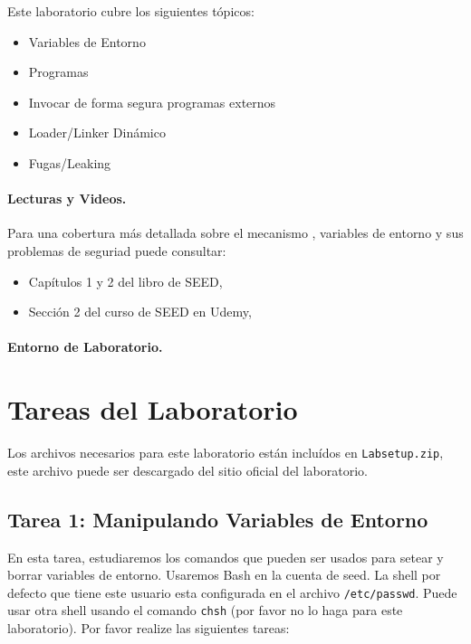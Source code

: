 Este laboratorio cubre los siguientes tópicos:

\begin{itemize}[noitemsep]
\item Variables de Entorno
\item Programas \setuid
\item Invocar de forma segura programas externos
\item Loader/Linker Dinámico
\item Fugas/Leaking
\end{itemize}


\paragraph{Lecturas y Videos.}
Para una cobertura más detallada sobre el mecanismo \setuid, variables de entorno y sus problemas de seguriad puede consultar:

\begin{itemize}
\item Capítulos 1 y 2 del libro de SEED, \seedbook
\item Sección 2 del curso de SEED en Udemy, \seedcsvideo
\end{itemize}

\paragraph{Entorno de Laboratorio.} \seedenvironmentC





\section{Tareas del Laboratorio}

Los archivos necesarios para este laboratorio están incluídos en \texttt{Labsetup.zip}, este archivo puede ser descargado del sitio oficial del laboratorio.


\subsection{Tarea 1: Manipulando Variables de Entorno}

En esta tarea, estudiaremos los comandos que pueden ser usados para setear y borrar variables de entorno. Usaremos Bash en la cuenta de seed. La shell por defecto que tiene este usuario esta configurada en el archivo {\tt /etc/passwd}. Puede usar otra shell usando el comando {\tt chsh} (por favor no lo haga para este laboratorio). Por favor realize las siguientes tareas:

